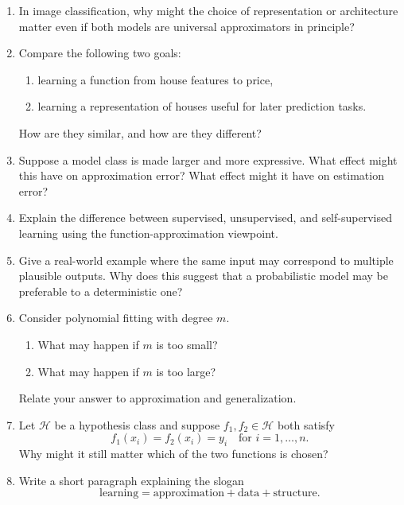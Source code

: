 \begin{enumerate}
    \item In image classification, why might the choice of representation or architecture matter even if both models are universal approximators in principle?

    \item Compare the following two goals:
    \begin{enumerate}
        \item learning a function from house features to price,
        \item learning a representation of houses useful for later prediction tasks.
    \end{enumerate}
    How are they similar, and how are they different?

    \item Suppose a model class is made larger and more expressive. What effect might this have on approximation error? What effect might it have on estimation error?

    \item Explain the difference between supervised, unsupervised, and self-supervised learning using the function-approximation viewpoint.

    \item Give a real-world example where the same input may correspond to multiple plausible outputs. Why does this suggest that a probabilistic model may be preferable to a deterministic one?

    \item Consider polynomial fitting with degree $m$.
    \begin{enumerate}
        \item What may happen if $m$ is too small?
        \item What may happen if $m$ is too large?
    \end{enumerate}
    Relate your answer to approximation and generalization.

    \item Let $\mathcal{H}$ be a hypothesis class and suppose $f_1,f_2 \in \mathcal{H}$ both satisfy
    \[
    f_1(x_i)=f_2(x_i)=y_i \quad \text{for } i=1,\dots,n.
    \]
    Why might it still matter which of the two functions is chosen?

    \item Write a short paragraph explaining the slogan
    \[
    \text{learning} = \text{approximation} + \text{data} + \text{structure}.
    \]
\end{enumerate}

